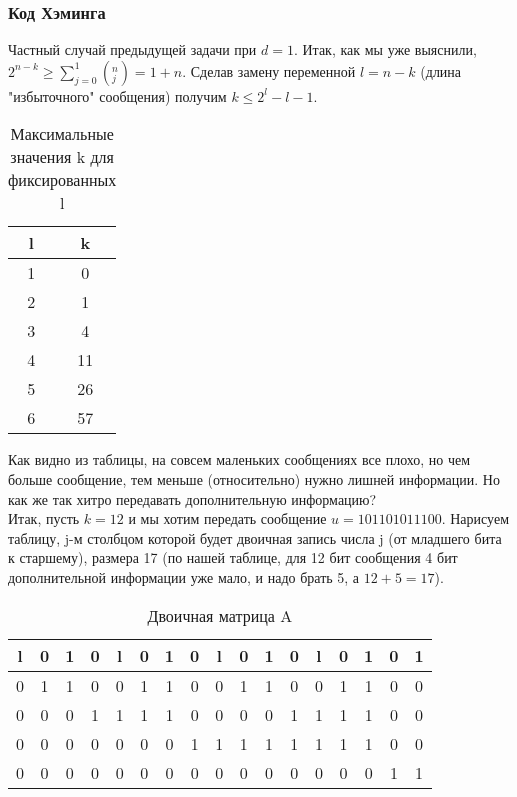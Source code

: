 \subsubsection{Код Хэминга}
Частный случай предыдущей задачи при $d = 1$. Итак, как мы уже выяснили, $2^{n - k} \geq \sum\limits_{j = 0}^1 (^n_j) = 1 + n$. Сделав замену переменной $l = n - k$ (длина "избыточного" сообщения) получим $k \leq 2^l - l - 1$.
\begin{table}[H]
\caption{Максимальные значения k для фиксированных l}
\label{tabular:messageLengths}
\begin{center}
\begin{tabular}{|c|c|}
\hline
l & k\\
\hline
1 & 0\\
\hline
2 & 1\\
\hline
3 & 4\\
\hline
4 & 11\\
\hline
5 & 26\\
\hline
6 & 57\\
\hline
\end{tabular}
\end{center}
\end{table}
Как видно из таблицы, на совсем маленьких сообщениях все плохо, но чем больше сообщение, тем меньше (относительно) нужно лишней информации. Но как же так хитро передавать дополнительную информацию?\\
Итак, пусть $k = 12$ и мы хотим передать сообщение $u = 101101011100$. Нарисуем таблицу, j-м столбцом которой будет двоичная запись числа j (от младшего бита к старшему), размера 17 (по нашей таблице, для 12 бит сообщения 4 бит дополнительной информации уже мало, и надо брать 5, а $12 + 5 = 17$).\\
\begin{table}[H]
\caption{Двоичная матрица A}
\label{tabular:binaryCodes}
\begin{center}
\begin{tabular}{|c|c|c|c|c|c|c|c|c|c|c|c|c|c|c|c|c|}
\hline
l & 0 & 1 & 0 & l & 0 & 1 & 0 & l & 0 & 1 & 0 & l & 0 & 1 & 0 & 1\\
\hline
0 & 1 & 1 & 0 & 0 & 1 & 1 & 0 & 0 & 1 & 1 & 0 & 0 & 1 & 1 & 0 & 0\\
\hline
0 & 0 & 0 & 1 & 1 & 1 & 1 & 0 & 0 & 0 & 0 & 1 & 1 & 1 & 1 & 0 & 0\\
\hline
0 & 0 & 0 & 0 & 0 & 0 & 0 & 1 & 1 & 1 & 1 & 1 & 1 & 1 & 1 & 0 & 0\\
\hline
0 & 0 & 0 & 0 & 0 & 0 & 0 & 0 & 0 & 0 & 0 & 0 & 0 & 0 & 0 & 1 & 1\\
\hline
\end{tabular}
\end{center}
\end{table}
